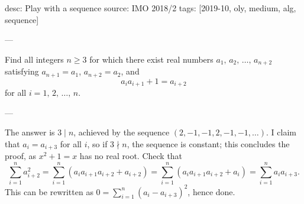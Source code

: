 desc: Play with a sequence
source: IMO 2018/2
tags: [2019-10, oly, medium, alg, sequence]

---

Find all integers $n\ge3$ for which there exist real numbers $a_1,\,a_2,\,\ldots,\,a_{n+2}$ satisfying $a_{n+1}=a_1$, $a_{n+2}=a_2$, and \[a_ia_{i+1}+1=a_{i+2}\]
for all $i=1,\,2,\,\ldots,\,n$.

---

The answer is $3\mid n$, achieved by the sequence $(2,-1,-1,2,-1,-1,\ldots)$. I claim that $a_i=a_{i+3}$ for all $i$, so if $3\nmid n$, the sequence is constant; this concludes the proof, as $x^2+1=x$ has no real root. Check that \[\sum_{i=1}^na_{i+2}^2=\sum_{i=1}^n\left(a_ia_{i+1}a_{i+2}+a_{i+2}\right)=\sum_{i=1}^n\left(a_ia_{i+1}a_{i+2}+a_i\right)=\sum_{i=1}^na_ia_{i+3}.\]
This can be rewritten as $0=\sum_{i=1}^n\left(a_i-a_{i+3}\right)^2$, hence done.

